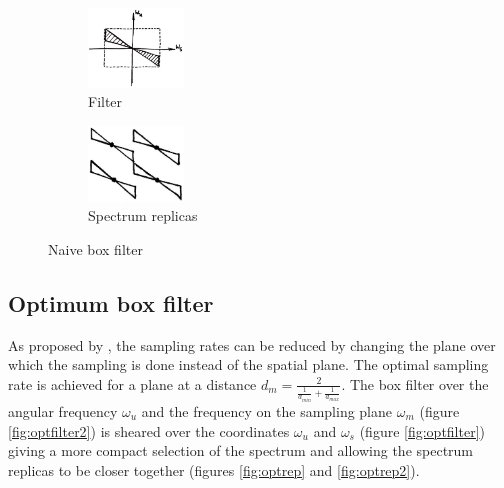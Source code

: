 \documentclass[acmtog,review,anonymous]{acmart}
\begin{document}
\begin{figure}[h]
  \centering
  \begin{subfigure}[t]{1in}
    \centering
    \includegraphics[width=1in]{figures/naivefilter}
    \caption{Filter}\label{fig:naivefilter}
  \end{subfigure}
  \quad
  \begin{subfigure}[t]{1in}
    \centering
    \includegraphics[width=1in]{figures/naiverep}
    \caption{Spectrum replicas}\label{fig:naiverep}
  \end{subfigure}
  \caption{Naive box filter}\label{fig:naive}
\end{figure}

\subsection{Optimum box filter}

As proposed by \cite{Chai:2000:PS:344779.344932}, the sampling rates can be reduced by changing the plane over which the sampling is done instead of the spatial plane. The optimal sampling rate is achieved for a plane at a distance $d_{m} = \frac{2}{\frac{1}{d_{min}} + \frac{1}{d_{max}}}$. The box filter over the angular frequency $\omega_{u}$ and the frequency on the sampling plane $\omega_{m}$ (figure \ref{fig:optfilter2}) is sheared over the coordinates $\omega_{u}$ and $\omega_{s}$ (figure \ref{fig:optfilter}) giving a more compact selection of the spectrum and allowing the spectrum replicas to be closer together (figures \ref{fig:optrep} and \ref{fig:optrep2}).
\end{document}
